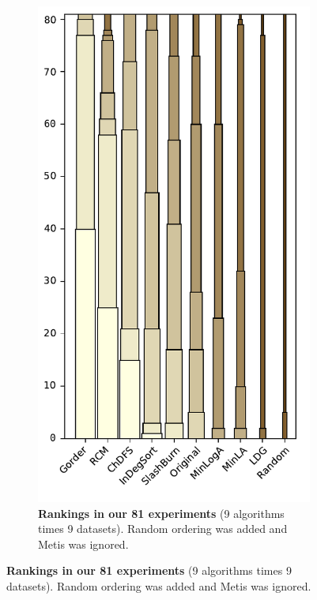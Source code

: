 \begin{figure}[htb]
\centering 
\begin{subfigure}{.48\textwidth}
\includegraphics[width=\linewidth]{img/img-ranking_vert.pdf}
\caption{\textbf{Rankings in our 81 experiments} (9 algorithms times 9 datasets). Random ordering was added and Metis was ignored. }\label{img-ranking-fab}
\end{subfigure}
\hspace{.02\textwidth}

\end{figure}
